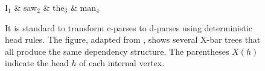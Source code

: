 \documentclass[11pt,letterpaper]{article}
\newcommand{\ParseName}{\textsc{ParPar}}
\newcommand{\nascomment}[1]{\textcolor{blue}{\bf \small [#1 --nas]}}
\begin{document}
\begin{figure}
  \centering

  \vspace{-1cm}

  \begin{dependency}[theme=simple]
    \begin{deptext}[column sep=0.7cm]
      I$_1$ \& saw$_2$ \& the$_3$ \& man$_4$ \\
    \end{deptext}
  \end{dependency}

  \label{fig:inverse}
  \caption{{\footnotesize 
      It is standard to transform c-parses to d-parses using deterministic head rules.
      The figure, adapted from
      \cite{collins1999statistical}, shows several X-bar trees that
      all produce the same dependency structure. The parentheses
      $X(h)$ indicate the head $h$ of each internal vertex. }
    }
\end{figure}





\end{document}
